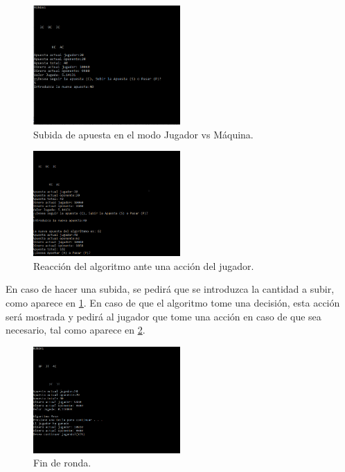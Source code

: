 \begin{figure}[h]
\centering
\includegraphics[width=0.5\textwidth]{figuras/C_JE.png}   
\caption{Subida de apuesta en el modo Jugador vs Máquina.}
\label{fig:C_JE}
\end{figure}

\begin{figure}[h]
\centering
\includegraphics[width=0.5\textwidth]{figuras/C_J.png}   
\caption{Reacción del algoritmo ante una acción del jugador.}
\label{fig:C_J}
\end{figure}

En caso de hacer una subida, se pedirá que se introduzca la cantidad a subir, como aparece en \ref{fig:C_JE}. En caso de que el algoritmo tome una decisión, esta acción será mostrada y pedirá al jugador que tome una acción en caso de que sea necesario, tal como aparece en \ref{fig:C_J}.

\begin{figure}[h]
\centering
\includegraphics[width=0.5\textwidth]{figuras/C_jf.png}   
\caption{Fin de ronda.}
\label{fig:C_jf}
\end{figure}

